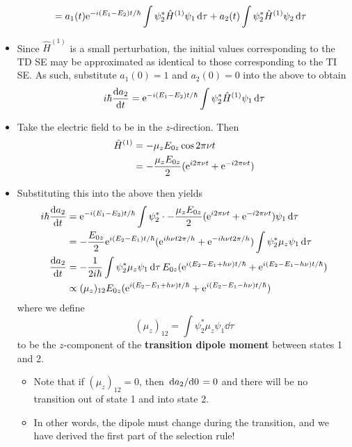 \documentclass[../notes.tex]{subfiles}
\begin{document}
\begin{itemize}
\begin{align*}
        &= a_1(t)\e[-i(E_1-E_2)t/\hbar]\int\psi_2^*\hat{H}^{(1)}\psi_1\dd{\tau}+a_2(t)\int\psi_2^*\hat{H}^{(1)}\psi_2\dd{\tau}
    \end{align*}
    \item Since $\hat{H}^{(1)}$ is a small perturbation, the initial values corresponding to the TD SE may be approximated as identical to those corresponding to the TI SE. As such, substitute $a_1(0)=1$ and $a_2(0)=0$ into the above to obtain
    \begin{equation*}
        i\hbar\dv{a_2}{t} = \e[-i(E_1-E_2)t/\hbar]\int\psi_2^*\hat{H}^{(1)}\psi_1\dd{\tau}
    \end{equation*}
    \item Take the electric field to be in the $z$-direction. Then
    \begin{align*}
        \hat{H}^{(1)} &= -\mu_zE_{0z}\cos 2\pi\nu t\\
        &= -\frac{\mu_zE_{0z}}{2}(\e[i2\pi\nu t]+\e[-i2\pi\nu t])
    \end{align*}
    \item Substituting this into the above then yields
    \begin{align*}
        i\hbar\dv{a_2}{t} &= \e[-i(E_1-E_2)t/\hbar]\int\psi_2^*\cdot -\frac{\mu_zE_{0z}}{2}(\e[i2\pi\nu t]+\e[-i2\pi\nu t])\psi_1\dd{\tau}\\
        &= -\frac{E_{0z}}{2}\e[i(E_2-E_1)t/\hbar](\e[ih\nu t2\pi/h]+\e[-ih\nu t2\pi/h])\int\psi_2^*\mu_z\psi_1\dd{\tau}\\
        \dv{a_2}{t} &= -\frac{1}{2i\hbar}\int\psi_2^*\mu_z\psi_1\dd{\tau}E_{0z}(\e[i(E_2-E_1+h\nu)t/\hbar]+\e[i(E_2-E_1-h\nu)t/\hbar])\\
        &\propto (\mu_z)_{12}E_{0z}(\e[i(E_2-E_1+h\nu)t/\hbar]+\e[i(E_2-E_1-h\nu)t/\hbar])
    \end{align*}
    where we define
    \begin{equation*}
        (\mu_z)_{12} = \int\psi_2^*\mu_z\psi_1\dd{\tau}
    \end{equation*}
    to be the $z$-component of the \textbf{transition dipole moment} between states 1 and 2.
    \begin{itemize}
        \item Note that if $(\mu_z)_{12}=0$, then $\dv*{a_2}{0}=0$ and there will be no transition out of state 1 and into state 2.
        \item In other words, the dipole must change during the transition, and we have derived the first part of the selection rule!
    \end{itemize}

\end{itemize}
\end{document}
